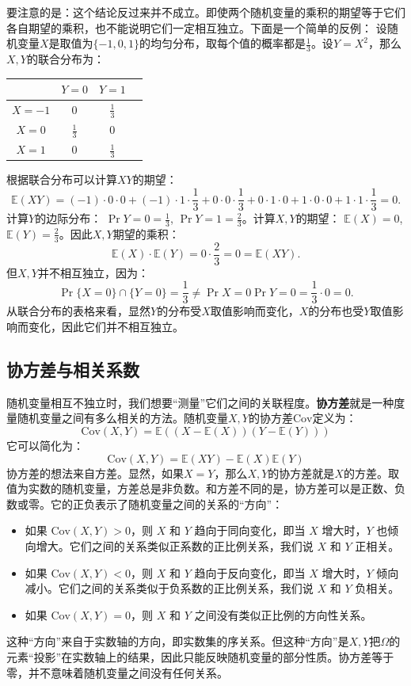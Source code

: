 \documentclass[12pt,UTF8]{ctexbook}
\begin{document}
要注意的是：这个结论反过来并不成立。即使两个随机变量的乘积的期望等于它们各自期望的乘积，也不能说明它们一定相互独立。下面是一个简单的反例：
设随机变量$X$是取值为$\{-1,0,1\}$的均匀分布，取每个值的概率都是$\displaystyle \frac{1}{3}$。设$Y=X^2$，那么$X,Y$的联合分布为：
\begin{center}
\begin{tabular}{c|ccc}
 & \(Y=0\) & \(Y=1\) \\ \hline
\(X=-1\) & 0 & \(\frac{1}{3}\)  \\
\(X=0\) & \(\frac{1}{3}\) & 0 \\
\(X=1\) & 0 & \(\frac{1}{3}\)
\end{tabular}
\end{center}
根据联合分布可以计算$XY$的期望：
\[\mathbb{E}(XY) = (-1)\cdot0\cdot0 + (-1)\cdot1\cdot\frac{1}{3} + 0\cdot0\cdot\frac{1}{3} + 0\cdot 1\cdot 0 + 1\cdot 0\cdot 0 + 1\cdot1\cdot\frac{1}{3} = 0.\]
计算$Y$的边际分布：
\(\Pr{Y=0} = \frac{1}{3}\), \(\Pr{Y=1} = \frac{2}{3}\)。计算$X,Y$的期望：
\(\mathbb{E}(X) = 0\), \(\mathbb{E}(Y) = \frac{2}{3}\)。因此$X,Y$期望的乘积：
\[\mathbb{E}(X) \cdot \mathbb{E}(Y) = 0 \cdot \frac{2}{3} = 0 = \mathbb{E}(XY).\]
但$X,Y$并不相互独立，因为：
\[\Pr{\{X=0\}\cap\{Y=0\}} = \frac{1}{3} \neq \Pr{X=0}\Pr{Y=0} = \frac{1}{3} \cdot 0 = 0.
\]
从联合分布的表格来看，显然$Y$的分布受$X$取值影响而变化，$X$的分布也受$Y$取值影响而变化，因此它们并不相互独立。

\subsection{协方差与相关系数}

随机变量相互不独立时，我们想要“测量”它们之间的关联程度。\textbf{协方差}就是一种度量随机变量之间有多么相关的方法。随机变量$X,Y$的协方差$\text{Cov}$定义为：
\[
\text{Cov}(X,Y) = \mathbb{E}((X - \mathbb{E}(X))(Y - \mathbb{E}(Y)))
\]
它可以简化为：
\[
\text{Cov}(X,Y) = \mathbb{E}(XY) - \mathbb{E}(X)\mathbb{E}(Y)
\]
协方差的想法来自方差。显然，如果$X=Y$，那么$X,Y$的协方差就是$X$的方差。取值为实数的随机变量，方差总是非负数。和方差不同的是，协方差可以是正数、负数或零。它的正负表示了随机变量之间的关系的“方向”：
\begin{itemize}
    \item 如果 \(\text{Cov}(X,Y) > 0\)，则 \(X\) 和 \(Y\) 趋向于同向变化，即当 \(X\) 增大时，\(Y\) 也倾向增大。它们之间的关系类似正系数的正比例关系，我们说 \(X\) 和 \(Y\) 正相关。
    \item 如果 \(\text{Cov}(X,Y) < 0\)，则 \(X\) 和 \(Y\) 趋向于反向变化，即当 \(X\) 增大时，\(Y\) 倾向减小。它们之间的关系类似于负系数的正比例关系，我们说 \(X\) 和 \(Y\) 负相关。
    \item 如果 \(\text{Cov}(X,Y) = 0\)，则 \(X\) 和 \(Y\) 之间没有类似正比例的方向性关系。
\end{itemize}
这种“方向”来自于实数轴的方向，即实数集的序关系。但这种“方向”是$X,Y$把$\Omega$的元素“投影”在实数轴上的结果，因此只能反映随机变量的部分性质。协方差等于零，并不意味着随机变量之间没有任何关系。
\end{document}
